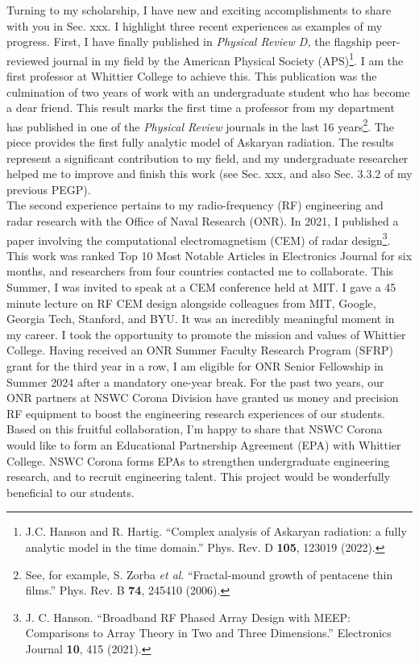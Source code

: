 \documentclass[../../main.tex]{subfiles}
\begin{document}
Turning to my scholarship, I have new and exciting accomplishments to share with you in Sec. xxx.  I highlight three recent experiences as examples of my progress.  First, I have finally published in \textit{Physical Review D,} the flagship peer-reviewed journal in my field by the American Physical Society (APS)\footnote{J.C. Hanson and R. Hartig. ``Complex analysis of Askaryan radiation: a fully analytic model in the time domain.'' Phys. Rev. D \textbf{105}, 123019 (2022).}.  I am the first professor at Whittier College to achieve this.  This publication was the culmination of two years of work with an undergraduate student who has become a dear friend.  This result marks the first time a professor from my department has published in one of the \textit{Physical Review} journals in the last 16 years\footnote{See, for example, S. Zorba \textit{et al}. ``Fractal-mound growth of pentacene thin films.'' Phys. Rev. B \textbf{74}, 245410 (2006).}.  The piece provides the first fully analytic model of Askaryan radiation.  The results represent a significant contribution to my field, and my undergraduate researcher helped me to improve and finish this work (see Sec. xxx, and also Sec. 3.3.2 of my previous PEGP).
\\
\vspace{0.25cm}
The second experience pertains to my radio-frequency (RF) engineering and radar research with the Office of Naval Research (ONR).  In 2021, I published a paper involving the computational electromagnetism (CEM) of radar design\footnote{J. C. Hanson.  ``Broadband RF Phased Array Design with MEEP: Comparisons to Array Theory in Two and Three Dimensions.'' Electronics Journal \textbf{10}, 415 (2021).}.  This work was ranked Top 10 Most Notable Articles in Electronics Journal for six months, and researchers from four countries contacted me to collaborate.  This Summer, I was invited to speak at a CEM conference held at MIT.  I gave a 45 minute lecture on RF CEM design alongside colleagues from MIT, Google, Georgia Tech, Stanford, and BYU.  It was an incredibly meaningful moment in my career.  I took the opportunity to promote the mission and values of Whittier College.  Having received an ONR Summer Faculty Research Program (SFRP) grant for the third year in a row, I am eligible for ONR Senior Fellowship in Summer 2024 after a mandatory one-year break.  For the past two years, our ONR partners at NSWC Corona Division have granted us money and precision RF equipment to boost the engineering research experiences of our students.  Based on this fruitful collaboration, I'm happy to share that NSWC Corona would like to form an Educational Partnership Agreement (EPA) with Whittier College.  NSWC Corona forms EPAs to strengthen undergraduate engineering research, and to recruit engineering talent.  This project would be wonderfully beneficial to our students.
\end{document}
